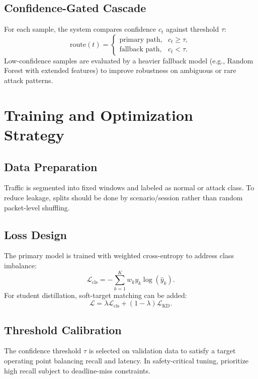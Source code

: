 \documentclass[conference]{IEEEtran}
\begin{document}
\subsection{Confidence-Gated Cascade}
For each sample, the system compares confidence $c_t$ against threshold $\tau$:
\begin{equation}
\text{route}(t)=
\begin{cases}
\text{primary path}, & c_t \ge \tau,\\
\text{fallback path}, & c_t < \tau.
\end{cases}
\end{equation}
Low-confidence samples are evaluated by a heavier fallback model (e.g., Random Forest with extended features) to improve robustness on ambiguous or rare attack patterns.

\section{Training and Optimization Strategy}
\subsection{Data Preparation}
Traffic is segmented into fixed windows and labeled as normal or attack class. To reduce leakage, splits should be done by scenario/session rather than random packet-level shuffling.

\subsection{Loss Design}
The primary model is trained with weighted cross-entropy to address class imbalance:
\begin{equation}
\mathcal{L}_{\text{cls}} = -\sum_{k=1}^{K} w_k y_k \log(\hat{y}_k).
\end{equation}
For student distillation, soft-target matching can be added:
\begin{equation}
\mathcal{L}=\lambda\mathcal{L}_{\text{cls}} + (1-\lambda)\mathcal{L}_{\text{KD}}.
\end{equation}

\subsection{Threshold Calibration}
The confidence threshold $\tau$ is selected on validation data to satisfy a target operating point balancing recall and latency. In safety-critical tuning, prioritize high recall subject to deadline-miss constraints.
\end{document}
